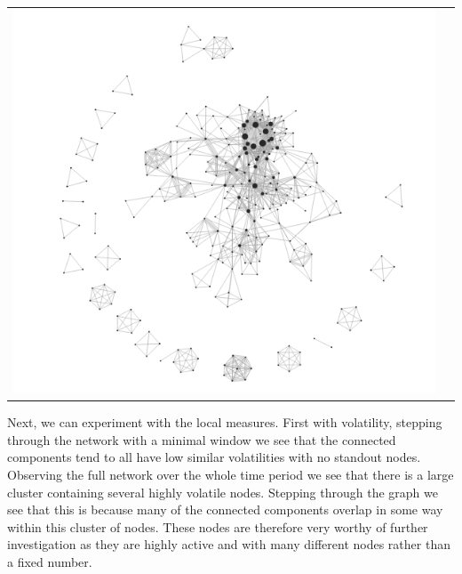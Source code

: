 \begin{center}
\begin{tabular}{cc}
\label{edgeTypes}
\includegraphics[trim={0 0 0 0}, width=140mm]{./Figures/TurinLocalVolatilityFull.png}
\end{tabular}
\end{center}
Next, we can experiment with the local measures. First with volatility, stepping through the network with a minimal window we see that the connected components tend to all have low similar volatilities with no standout nodes. Observing the full network over the whole time period we see that there is a large cluster containing several highly volatile nodes. Stepping through the graph we see that this is because many of the connected components overlap in some way within this cluster of nodes. These nodes are therefore very worthy of further investigation as they are highly active and with many different nodes rather than a fixed number.


